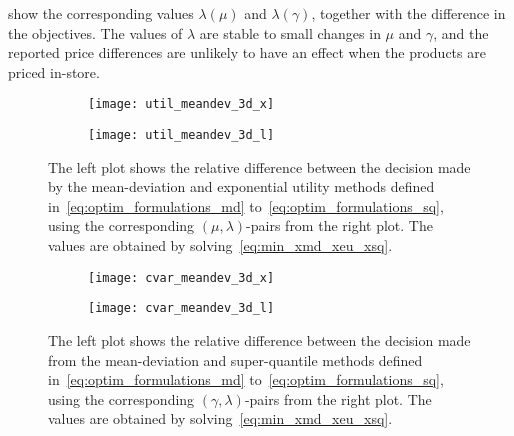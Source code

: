\documentclass[main.tex]{subfiles}
\begin{document}
\begin{example}
   show the
  corresponding values $\lambda(\mu)$ and $\lambda(\gamma)$, together
  with the difference in the objectives. The values of $\lambda$
  are stable to small changes in $\mu$ and $\gamma$, and the
  reported price differences are unlikely to have an effect when
  the products are priced in-store.
  \begin{figure}[htbp]
    \centering
    \begin{subfigure}[t]{.5\textwidth}
      \texttt{[image: util\_meandev\_3d\_x]}
    \end{subfigure}%
    \begin{subfigure}[t]{.5\textwidth}
      \texttt{[image: util\_meandev\_3d\_l]}
    \end{subfigure}
    \caption[Comparison between two decision maker models]{The left
      plot shows the relative difference between the decision made
      by the mean-deviation and exponential utility methods defined
      in~\eqref{eq:optim_formulations_md}
      to~\eqref{eq:optim_formulations_sq}, using the corresponding
      $(\mu,\lambda)$-pairs from the right plot.
      The values are obtained by solving~\eqref{eq:min_xmd_xeu_xsq}.
    }\label{fig:util_meandev_2d}
  \end{figure}

  \begin{figure}[hbtp]
    \centering
    \begin{subfigure}[t]{.5\textwidth}
      \texttt{[image: cvar\_meandev\_3d\_x]}
    \end{subfigure}%
    \begin{subfigure}[t]{.5\textwidth}
      \texttt{[image: cvar\_meandev\_3d\_l]}
    \end{subfigure}
    \caption[Comparison between two decision maker models]{The left
      plot shows the relative difference between the decision made
      from the mean-deviation and super-quantile methods defined
      in~\eqref{eq:optim_formulations_md}
      to~\eqref{eq:optim_formulations_sq}, using the corresponding
      $(\gamma,\lambda)$-pairs from the right plot.
      The values are obtained by solving~\eqref{eq:min_xmd_xeu_xsq}.
    }\label{fig:cvar_meandev_2d}
  \end{figure}
\end{example}
\end{document}
